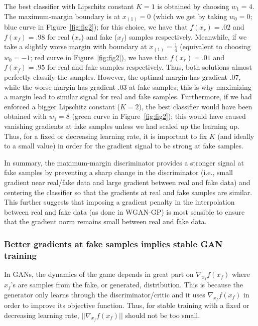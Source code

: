 \documentclass{article}
\begin{document}
The best classifier with Lipschitz constant $K=1$ is obtained by choosing $w_1 = 4$. The maximum-margin boundary is at $x_{(1)}=0$ (which we get by taking $w_0=0$; blue curve in Figure~\ref{fig:fig2}); for this choice, we have that $f(x_{r})=.02$ and $f(x_{f})=.98$ for real ($x_r$) and fake ($x_f$) samples respectively. Meanwhile, if we take a slightly worse margin with boundary at $x_{(1)} = \frac{1}{4}$ (equivalent to choosing $w_0=-1$; red curve in Figure~\ref{fig:fig2}), we have that $f(x_{r})=.01$ and $f(x_{f})=.95$ for real and fake samples respectively. Thus, both solutions almost perfectly classify the samples. However, the optimal margin has gradient $.07$, while the worse margin has gradient $.03$ at fake samples; this is why maximizing a margin lead to similar signal for real and fake samples. Furthermore, if we had enforced a bigger Lipschitz constant ($K=2$), the best classifier would have been obtained with $w_1 = 8$ (green curve in Figure~\ref{fig:fig2}); this would have caused vanishing gradients at fake samples unless we had scaled up the learning up. Thus, for a fixed or decreasing learning rate, it is important to fix $K$ (and ideally to a small value) in order for the gradient signal to be strong at fake samples.

In summary, the maximum-margin discriminator provides a stronger signal at fake samples by preventing a sharp change in the discriminator (i.e., small gradient near real/fake data and large gradient between real and fake data) and centering the classifier so that the gradients at real and fake samples are similar. This further suggests that imposing a gradient penalty in the interpolation between real and fake data (as done in WGAN-GP) is most sensible to ensure that the gradient norm remains small between real and fake data. 

\subsubsection{Better gradients at fake samples implies stable GAN training}

In GANs, the dynamics of the game depends in great part on $\nabla_{x_{f}} f(x_{f})$ where $x_{f}$'s are samples from the fake, or generated, distribution.
This is because the generator only learns through the discriminator/critic and it uses $\nabla_{x_{f}} f(x_{f})$ in order to improve its objective function. Thus, for stable training with a fixed or decreasing learning rate, $||\nabla_{x_{f}} f(x_{f})||$ should not be too small.
\end{document}
